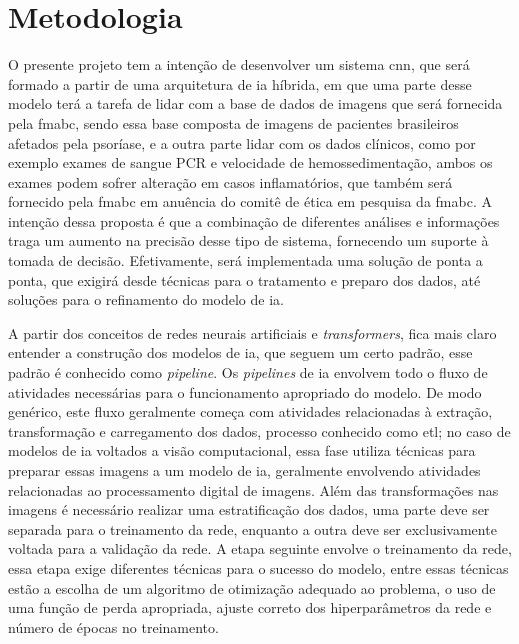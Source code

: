 \section{Metodologia}

O presente projeto tem a intenção de desenvolver um sistema \gls{cnn}, que será formado a partir de uma arquitetura de \gls{ia} híbrida, em que uma parte desse modelo terá a tarefa de lidar com a base de dados de imagens que será fornecida pela \gls{fmabc}, sendo essa base composta de imagens de pacientes brasileiros afetados pela psoríase, e a outra parte lidar com os dados clínicos, como por exemplo exames de sangue PCR e velocidade de hemossedimentação, ambos os exames podem sofrer alteração em casos inflamatórios, que também será fornecido pela \gls{fmabc} em anuência do comitê de ética em pesquisa da \gls{fmabc}. A intenção dessa proposta é que a combinação de diferentes análises e informações traga um aumento na precisão desse tipo de sistema, fornecendo um suporte à tomada de decisão. Efetivamente, será implementada uma solução de ponta a ponta, que exigirá desde técnicas para o tratamento e preparo dos dados, até soluções para o refinamento do modelo de \gls{ia}.


A partir dos conceitos de redes neurais artificiais e \textit{transformers}, fica mais claro entender a construção dos modelos de \gls{ia}, que seguem um certo padrão, esse padrão é conhecido como \textit{pipeline}. Os \textit{pipelines} de \gls{ia} envolvem todo o fluxo de atividades necessárias para o funcionamento apropriado do modelo. De modo genérico, este fluxo geralmente começa com atividades relacionadas à extração, transformação e carregamento dos dados, processo conhecido como \gls{etl}; no caso de modelos de \gls{ia} voltados a visão computacional, essa fase utiliza técnicas para preparar essas imagens a um modelo de \gls{ia}, geralmente envolvendo atividades relacionadas ao processamento digital de imagens. Além das transformações nas imagens é necessário realizar uma estratificação dos dados, uma parte deve ser separada para o treinamento da rede, enquanto a outra deve ser exclusivamente voltada para a validação da rede. A etapa seguinte envolve o treinamento da rede, essa etapa exige diferentes técnicas para o sucesso do modelo, entre essas técnicas estão a escolha de um algoritmo de otimização adequado ao problema, o uso de uma função de perda apropriada, ajuste correto dos hiperparâmetros da rede e número de épocas no treinamento.

